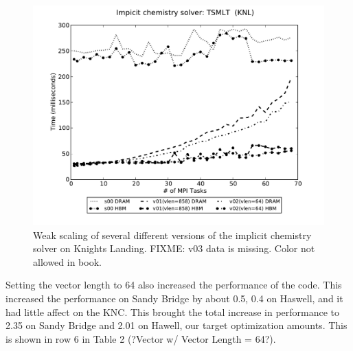 \begin{figure}[tbp]
 \begin{center}
\includegraphics[width=12.0cm]{figures/chem-knl.pdf}
\end{center}
\caption{Weak scaling of several different versions of the implicit chemistry solver on Knights Landing. {\color{red} FIXME:  v03 data is missing. Color not allowed in book.}}
\label{fig:chem-weak-knl}
\end{figure}

Setting the vector length to 64 also increased the performance of the code.  This increased the performance on Sandy Bridge by about 0.5, 0.4 on Haswell, and it had little affect on the KNC.  This brought the total increase in performance to 2.35 on Sandy Bridge and 2.01 on Hawell, our target optimization amounts.  This is shown in row 6 in Table 2 (?Vector w/ Vector Length = 64?).




